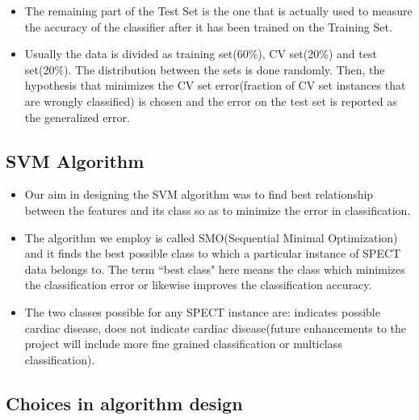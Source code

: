\documentclass[11pt,a4paper]{report}
\begin{document}
{\begin{itemize}
\item The remaining part of the Test Set is the one that is actually used to measure the accuracy of the classifier after it has been trained on the Training Set.\\
\item Usually the data is divided as training set(60\%), CV set(20\%) and test set(20\%). The distribution between the sets is done randomly. Then, the hypothesis that minimizes the CV set error(fraction of CV set instances that are wrongly classified) is chosen and the error on the test set is reported as the generalized error.\\
\end{itemize}


\subsection{SVM Algorithm}

\bigskip
\begin{itemize}
\item Our aim in designing the SVM algorithm was to find best relationship between the features and its class so as to minimize the error in classification.\\
\item The algorithm we employ is called SMO(Sequential Minimal Optimization) and it finds the best possible class to which a particular instance of SPECT data belongs to. The term ``best class" here means the class which minimizes the classification error or likewise improves the classification accuracy.\\
\item The two classes possible for any SPECT instance are: indicates possible cardiac disease, does not indicate cardiac disease(future enhancements to the project will include more fine grained classification or multiclass classification).\\
\end{itemize}

\subsection{Choices in algorithm design}

}
\end{document}
